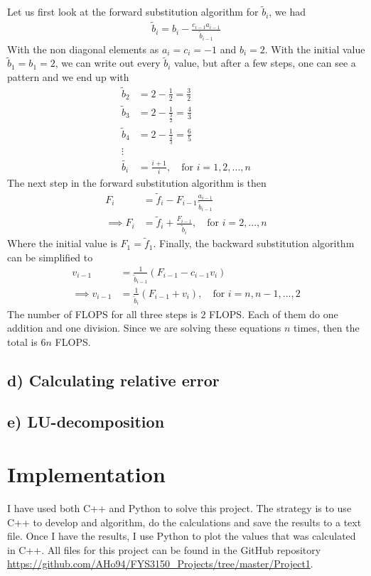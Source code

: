 \documentclass[12pt]{article}
\begin{document}
Let us first look at the forward substitution algorithm for $\tilde{b}_i$, we had
\begin{align}
\tilde{b}_i = b_i - \frac{c_{i-1}a_{i-1}}{\tilde{b}_{i-1}}
\end{align}
With the non diagonal elements as $a_i = c_i = -1$ and $b_i = 2$. With the initial value $\tilde{b}_1 = b_1 = 2$, we can write out every $\tilde{b}_i$ value, but after a few steps, one can see a pattern and we end up with
\begin{align}
\tilde{b}_2 &= 2 - \frac{1}{2} = \frac{3}{2} \nonumber \\
\tilde{b}_3 &= 2 - \frac{1}{\frac{3}{2}} = \frac{4}{3} \nonumber \\
\tilde{b}_4 &= 2 - \frac{1}{\frac{4}{3}} = \frac{6}{5} \nonumber \\
\vdots \nonumber \\
\tilde{b_i} &= \frac{i+1}{i}, \quad \text{for } i = 1,2,...,n
\end{align}
The next step in the forward substitution algorithm is then
\begin{align}
F_i &= \tilde{f}_i - F_{i-1}\frac{a_{i-1}}{\tilde{b}_{i-1}}  \nonumber \\
\implies F_i &= \tilde{f}_i + \frac{F_{i-1}}{\tilde{b}_i}, \quad \text{for } i=2,...,n
\end{align}
Where the initial value is $F_1 = \tilde{f}_1$. Finally, the backward substitution algorithm can be simplified to
\begin{align}
v_{i-1} &= \frac{1}{\tilde{b}_{i-1}}(F_{i-1}-c_{i-1}v_i) \nonumber \\
\implies v_{i-1} &= \frac{1}{\tilde{b}_i}(F_{i-1} + v_i), \quad \text{for } i = n, n-1, ..., 2
\end{align}
The number of FLOPS for all three steps is $2$ FLOPS. Each of them do one addition and one division. Since we are solving these equations $n$ times, then the total is $6n$ FLOPS.

\subsection*{d) Calculating relative error}

\subsection*{e) LU-decomposition}

\section{Implementation}
I have used both C++ and Python to solve this project. The strategy is to use C++ to develop and algorithm, do the calculations and save the results to a text file. Once I have the results, I use Python to plot the values that was calculated in C++. All files for this project can be found in the GitHub repository \url{https://github.com/AHo94/FYS3150_Projects/tree/master/Project1}.
\end{document}
